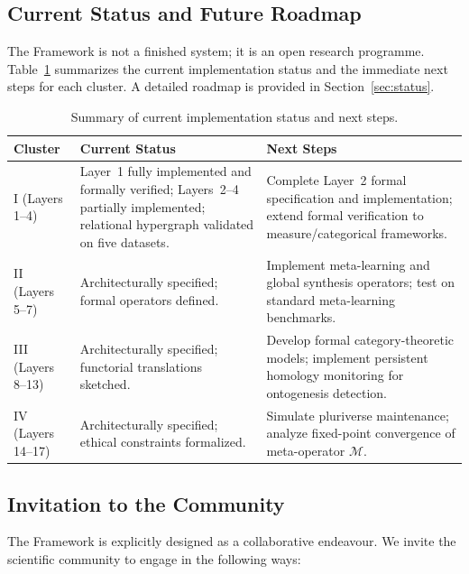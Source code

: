 \subsection*{Current Status and Future Roadmap}

The \Apeiron{} Framework is not a finished system; it is an open research programme. Table~\ref{tab:status_summary} summarizes the current implementation status and the immediate next steps for each cluster. A detailed roadmap is provided in Section~\ref{sec:status}.

\begin{table}[htbp]
\centering
\caption{Summary of current implementation status and next steps.}
\label{tab:status_summary}
\begin{tabular}{p{} p{} p{}}
\toprule
\textbf{Cluster} & \textbf{Current Status} & \textbf{Next Steps} \\
\midrule
I (Layers 1--4) & Layer~1 fully implemented and formally verified; Layers~2--4 partially implemented; relational hypergraph validated on five datasets. & Complete Layer~2 formal specification and implementation; extend formal verification to measure/categorical frameworks. \\
II (Layers 5--7) & Architecturally specified; formal operators defined. & Implement meta-learning and global synthesis operators; test on standard meta-learning benchmarks. \\
III (Layers 8--13) & Architecturally specified; functorial translations sketched. & Develop formal category-theoretic models; implement persistent homology monitoring for ontogenesis detection. \\
IV (Layers 14--17) & Architecturally specified; ethical constraints formalized. & Simulate pluriverse maintenance; analyze fixed-point convergence of meta-operator $\mathcal{M}$. \\
\bottomrule
\end{tabular}
\end{table}

\subsection*{Invitation to the Community}

The \Apeiron{} Framework is explicitly designed as a collaborative endeavour. We invite the scientific community to engage in the following ways:

